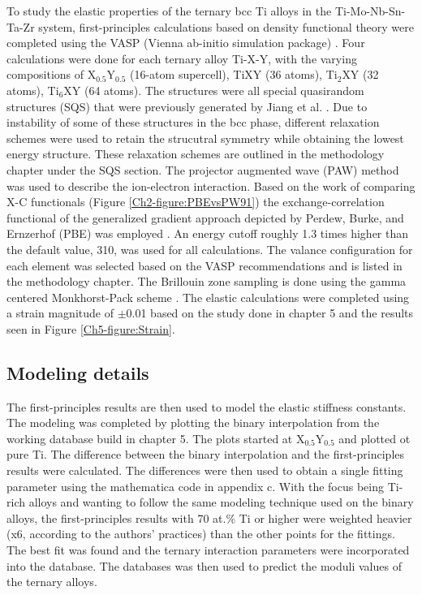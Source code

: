 To study the elastic properties of the ternary bcc Ti alloys in the Ti-Mo-Nb-Sn-Ta-Zr system, first-principles calculations based on density functional theory were completed using the VASP (Vienna ab-initio simulation package) \cite{Kresse1996,Kresse1999}. Four calculations were done for each ternary alloy Ti-X-Y, with the varying compositions of X$_{0.5}$Y$_{0.5}$ (16-atom supercell), TiXY (36 atoms), Ti$_2$XY (32 atoms), Ti$_6$XY (64 atoms). The structures were all special quasirandom structures (SQS) that were previously generated by Jiang et al. \cite{Jiang2004,Jiang2009}. Due to instability of some of these structures in the bcc phase, different relaxation schemes were used to retain the strucutral symmetry while obtaining the lowest energy structure. These relaxation schemes are outlined in the methodology chapter under the SQS section. The projector augmented wave (PAW) method was used to describe the ion-electron interaction. Based on the work of comparing X-C functionals (Figure \ref{Ch2-figure:PBEvsPW91}) the exchange-correlation functional of the generalized gradient approach depicted by Perdew, Burke, and Ernzerhof (PBE) was employed \cite{Perdew1996a}. An energy cutoff roughly 1.3 times higher than the default value, 310, was used for all calculations. The valance configuration for each element was selected based on the VASP recommendations and is listed in the methodology chapter. The Brillouin zone sampling is done using the gamma centered Monkhorst-Pack scheme \cite{Monkhorst1976a}. The elastic calculations were completed using a strain magnitude of $\pm$0.01 based on the study done in chapter 5 and the results seen in Figure \ref{Ch5-figure:Strain}.

\subsection{Modeling details}

The first-principles results are then used to model the elastic stiffness constants. The modeling was completed by plotting the binary interpolation from the working database build in chapter 5. The plots started at X$_{0.5}$Y$_{0.5}$ and plotted ot pure Ti. The difference between the binary interpolation and the first-principles results were calculated. The differences were then used to obtain a single fitting parameter using the mathematica code in appendix c. With the focus being Ti-rich alloys and wanting to follow the same modeling technique used on the binary alloys, the first-principles results with 70 at.\% Ti or higher were weighted heavier (x6, according to the authors' practices) than the other points for the fittings. The best fit was found and the ternary interaction parameters were incorporated into the database. The databases was then used to predict the moduli values of the ternary alloys. 

